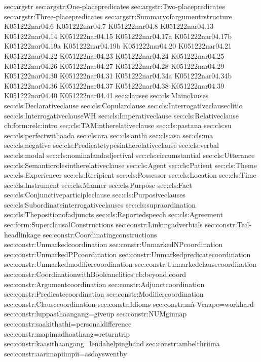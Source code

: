 {sec:argstr}
{sec:argstr:One-placepredicates}
{sec:argstr:Two-placepredicates}
{sec:argstr:Three-placepredicates}
{sec:argstr:Summaryofargumentrstructure}
{K051222nar04.6}
{K051222nar04.7}
{K051222nar04.8}
{K051222nar04.13}
{K051222nar04.14}
{K051222nar04.15}
{K051222nar04.17a}
{K051222nar04.17b}
{K051222nar04.19a}
{K051222nar04.19b}
{K051222nar04.20}
{K051222nar04.21}
{K051222nar04.22}
{K051222nar04.23}
{K051222nar04.24}
{K051222nar04.25}
{K051222nar04.26}
{K051222nar04.27}
{K051222nar04.28}
{K051222nar04.29}
{K051222nar04.30}
{K051222nar04.31}
{K051222nar04.34a}
{K051222nar04.34b}
{K051222nar04.36}
{K051222nar04.37}
{K051222nar04.38}
{K051222nar04.39}
{K051222nar04.40}
{K051222nar04.41}
{sec:clauses}
{sec:cls:Mainclauses}
{sec:cls:Declarativeclause}
{sec:cls:Copularclause}
{sec:cls:Interrogativeclauseclitic}
{sec:cls:InterrogativeclauseWH}
{sec:cls:Imperativeclause}
{sec:cls:Relativeclause}
{cb:form:relc:intro}
{sec:cls:TAMintherelativeclause}
{sec:cls:pastana}
{sec:cls:su}
{sec:cls:perfectwithaada}
{sec:cls:ara}
{sec:cls:anthi}
{sec:cls:asa}
{sec:cls:ma}
{sec:cls:negative}
{sec:cls:Predicatetypesintherelativeclause}
{sec:cls:verbal}
{sec:cls:modal}
{sec:cls:nominalandadjectival}
{sec:cls:circumstantial}
{sec:cls:Utterance}
{sec:cls:Semanticrolesintherelativeclause}
{sec:cls:Agent}
{sec:cls:Patient}
{sec:cls:Theme}
{sec:cls:Experiencer}
{sec:cls:Recipient}
{sec:cls:Possessor}
{sec:cls:Location}
{sec:cls:Time}
{sec:cls:Instrument}
{sec:cls:Manner}
{sec:cls:Purpose}
{sec:cls:Fact}
{sec:cls:Conjunctiveparticipleclause}
{sec:cls:Purposiveclauses}
{sec:cls:Subordinateinterrogativeclauses}
{sec:cls:supraordination}
{sec:cls:Thepositionofadjuncts}
{sec:cls:Reportedspeech}
{sec:cls:Agreement}
{sec:form:SuperclausalConstructions}
{sec:constr:Linkingadverbials}
{sec:constr:Tail-headlinkage}
{sec:constr:Coordinatingconstructions}
{sec:constr:Unmarkedcoordination}
{sec:constr:UnmarkedNPcoordination}
{sec:constr:UnmarkedPPcoordination}
{sec:constr:Unmarkedpredicatecoordination}
{sec:constr:Unmarkedmodifiercoordination}
{sec:constr:Unmarkedclausecoordination}
{sec:constr:CoordinationwithBooleanclitics}
{cb:beyond:coord}
{sec:constr:Argumentcoordination}
{sec:constr:Adjunctcoordination}
{sec:constr:Predicatecoordination}
{sec:constr:Modifiercoordination}
{sec:constr:Clausecoordination}
{sec:constr:Idioms}
{sec:constr:mà-Vcaape=workhard}
{sec:constr:luppasthaangang=giveup}
{sec:constr:NUMginnap}
{sec:constr:saakithathi=personaldifference}
{sec:constr:mapimadhaathang=returntrip}
{sec:constr:kaasithaangang=lendahelpinghand}
{sec:constr:ambelthriima}
{sec:constr:aarimapiimpii=asdayswentby}
